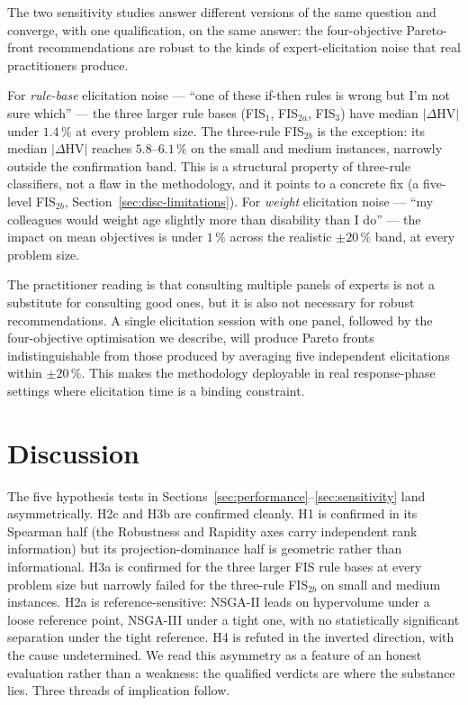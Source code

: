\documentclass[applsci,article,submit,moreauthors,pdftex]{Definitions/mdpi}
\begin{document}
The two sensitivity studies answer different versions of the same question
and converge, with one qualification, on the same answer: the
four-objective Pareto-front recommendations are robust to the kinds of
expert-elicitation noise that real practitioners produce.

For \emph{rule-base} elicitation noise --- ``one of these if-then rules
is wrong but I'm not sure which'' --- the three larger rule bases
(FIS$_1$, FIS$_{2a}$, FIS$_3$) have median $|\Delta\mathrm{HV}|$ under
$1.4\,\%$ at every problem size. The three-rule FIS$_{2b}$ is the
exception: its median $|\Delta\mathrm{HV}|$ reaches $5.8$--$6.1\,\%$ on
the small and medium instances, narrowly outside the confirmation band.
This is a structural property of three-rule classifiers, not a flaw in
the methodology, and it points to a concrete fix (a five-level
FIS$_{2b}$, Section~\ref{sec:disc-limitations}). For \emph{weight}
elicitation noise --- ``my colleagues would weight age slightly more
than disability than I do'' --- the impact on mean objectives is under
$1\,\%$ across the realistic $\pm 20\,\%$ band, at every problem size.

The practitioner reading is that consulting multiple panels of experts is
not a substitute for consulting good ones, but it is also not necessary for
robust recommendations. A single elicitation session with one panel,
followed by the four-objective optimisation we describe, will produce
Pareto fronts indistinguishable from those produced by averaging five
independent elicitations within $\pm 20\,\%$. This makes the methodology
deployable in real response-phase settings where elicitation time is a
binding constraint.

\section{Discussion}\label{sec:discussion}

The five hypothesis tests in Sections~\ref{sec:performance}--\ref{sec:sensitivity}
land asymmetrically. H2c and H3b are confirmed cleanly. H1 is confirmed
in its Spearman half (the Robustness and Rapidity axes carry independent
rank information) but its projection-dominance half is geometric rather
than informational. H3a is confirmed for the three larger FIS rule
bases at every problem size but narrowly failed for the three-rule
FIS$_{2b}$ on small and medium instances. H2a is reference-sensitive:
NSGA-II leads on hypervolume under a loose reference point, NSGA-III
under a tight one, with no statistically significant separation under
the tight reference. H4 is refuted in the inverted direction, with the
cause undetermined. We read this asymmetry as a feature of an honest
evaluation rather than a weakness: the qualified verdicts are where the
substance lies. Three threads of implication follow.
\end{document}
